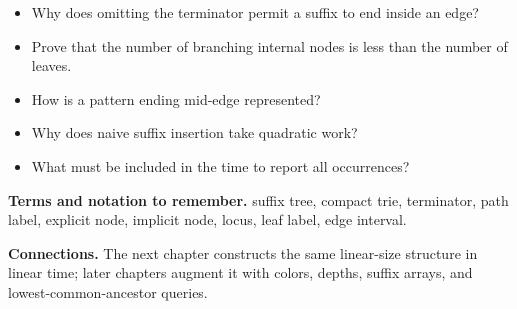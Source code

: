 \documentclass[11pt]{article}
\begin{document}
\begin{tcolorbox}[enhanced,breakable,title={Self-test questions},
  colback=white,colframe=Accent,fonttitle=\small\sffamily\bfseries,fontupper=\footnotesize,
  boxsep=0.6mm,left=1.5mm,right=1.5mm,top=1mm,bottom=1mm,before skip=3pt,after skip=3pt]
\begin{itemize}
  \item Why does omitting the terminator permit a suffix to end inside an edge?
  \item Prove that the number of branching internal nodes is less than the number of leaves.
  \item How is a pattern ending mid-edge represented?
  \item Why does naive suffix insertion take quadratic work?
  \item What must be included in the time to report all occurrences?
\end{itemize}
\end{tcolorbox}

{\footnotesize
\textbf{Terms and notation to remember.} suffix tree, compact trie, terminator, path label, explicit node, implicit node, locus, leaf label, edge interval.

\textbf{Connections.} The next chapter constructs the same linear-size structure in linear time; later chapters augment it with colors, depths, suffix arrays, and lowest-common-ancestor queries.
}
\end{document}
